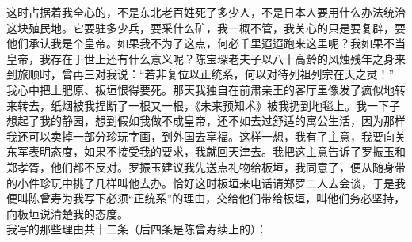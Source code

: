 这时占据着我全心的，不是东北老百姓死了多少人，不是日本人要用什么办法统治这块殖民地。它要驻多少兵，要采什么矿，我一概不管，我关心的只是要复辟，要他们承认我是个皇帝。如果我不为了这点，何必千里迢迢跑来这里呢？我如果不当皇帝，我存在于世上还有什么意义呢？陈宝琛老夫子以八十高龄的风烛残年之身来到旅顺时，曾再三对我说：“若非复位以正统系，何以对待列祖列宗在天之灵！”\\

我心中把土肥原、板垣恨得要死。那天我独自在前肃亲王的客厅里像发了疯似地转来转去，纸烟被我捏断了一根又一根，《未来预知术》被我扔到地毯上。我一下子想起了我的静园，想到假如我做不成皇帝，还不如去过舒适的寓公生活，因为那样我还可以卖掉一部分珍玩字画，到外国去享福。这样一想，我有了主意，我要向关东军表明态度，如果不接受我的要求，我就回天津去。我把这主意告诉了罗振玉和郑孝胥，他们都不反对。罗振玉建议我先送点礼物给板垣，我同意了，便从随身带的小件珍玩中挑了几样叫他去办。恰好这时板垣来电话请郑罗二人去会谈，于是我便叫陈曾寿为我写下必须“正统系”的理由，交给他们带给板垣，叫他们务必坚持，向板垣说清楚我的态度。\\

我写的那些理由共十二条（后四条是陈曾寿续上的）：\\


